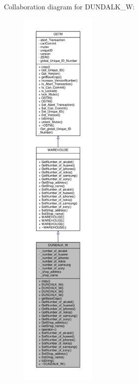 Collaboration diagram for D\+U\+N\+D\+A\+L\+K\+\_\+W\+:\nopagebreak
\begin{figure}[H]
\begin{center}
\leavevmode
\includegraphics[height=550pt]{class_d_u_n_d_a_l_k___w__coll__graph}
\end{center}
\end{figure}
